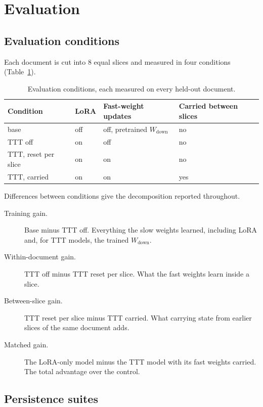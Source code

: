 \documentclass[12pt,a4paper]{report}
\begin{document}
\section{Evaluation}

\subsection{Evaluation conditions}

Each document is cut into 8 equal slices and measured in four conditions (Table~\ref{tab-conditions}).

\begin{table}[H]
  \centering
  \caption{Evaluation conditions, each measured on every held-out document.}
  \label{tab-conditions}
  \begin{tabular}{llll}
    \toprule
    Condition & LoRA & Fast-weight updates & Carried between slices \\
    \midrule
    base & off & off, pretrained $W_{\mathrm{down}}$ & no \\
    TTT off & on & off & no \\
    TTT, reset per slice & on & on & no \\
    TTT, carried & on & on & yes \\
    \bottomrule
  \end{tabular}
\end{table}

Differences between conditions give the decomposition reported throughout.
\begin{description}
  \item[Training gain.] Base minus TTT off. Everything the slow weights learned, including LoRA and, for TTT models, the trained $W_{\mathrm{down}}$.
  \item[Within-document gain.] TTT off minus TTT reset per slice. What the fast weights learn inside a slice.
  \item[Between-slice gain.] TTT reset per slice minus TTT carried. What carrying state from earlier slices of the same document adds.
  \item[Matched gain.] The LoRA-only model minus the TTT model with its fast weights carried. The total advantage over the control.
\end{description}

\subsection{Persistence suites}
\end{document}
